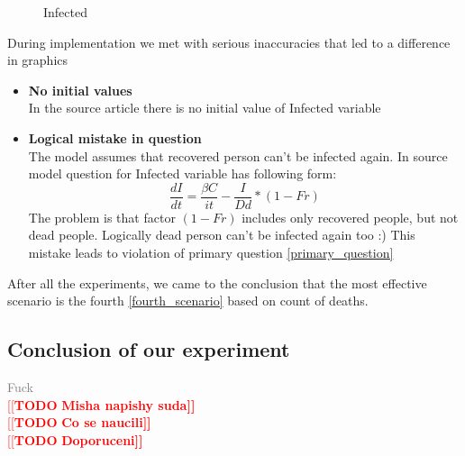 \documentclass[12pt,a4paper,english]{article}
\newcommand{\todo}[1]{\noindent\textcolor{red}{[[\textbf{TODO} \textbf{#1]]}}\\}
\newcommand{\phony}[1]{\textcolor{gray}{#1} \\}
\begin{document}
    \begin{figure}[H]
        \centering
        \hfill
        \caption{Infected}
    \end{figure}

    During implementation we met with serious inaccuracies that led to a difference in graphics
    \begin{itemize}
        \item \textbf{No initial values}\\ In the source article there is no initial value of Infected variable
        \item \textbf{Logical mistake in question}\\
        The model assumes that recovered person can't be infected again.
        In source model question for Infected variable has following form:
        $$\frac{dI}{dt} = \frac{\beta C}{it} - \frac{I}{Dd} * (1 - Fr)$$
        \noindent The problem is that factor $(1 - Fr)$ includes only recovered people, but not dead people. Logically dead person can't be infected again too :)
        This mistake leads to violation of primary question \eqref{primary_question}
    \end{itemize}

    After all the experiments, we came to the conclusion that the most effective  scenario is the fourth \eqref{fourth_scenario} based on count of deaths.

    \subsection{Conclusion of our experiment}

    \phony{Fuck}
    \todo{Misha napishy suda}

    \todo{Co se naucili}
    \todo{Doporuceni}    

    \clearpage
    \nocite{*}
	
	
\end{document}
